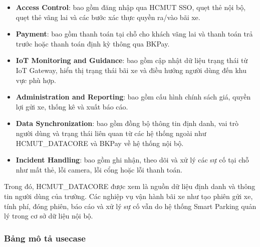     \begin{itemize}
        \item \textbf{Access Control}: bao gồm đăng nhập qua HCMUT SSO, quẹt thẻ nội bộ, quẹt thẻ vãng lai và các bước xác thực quyền ra/vào bãi xe.
        \item \textbf{Payment}: bao gồm thanh toán tại chỗ cho khách vãng lai và thanh toán trả trước hoặc thanh toán định kỳ thông qua BKPay.
        \item \textbf{IoT Monitoring and Guidance}: bao gồm cập nhật dữ liệu trạng thái từ IoT Gateway, hiển thị trạng thái bãi xe và điều hướng người dùng đến khu vực phù hợp.
        \item \textbf{Administration and Reporting}: bao gồm cấu hình chính sách giá, quyền lợi gửi xe, thống kê và xuất báo cáo.
        \item \textbf{Data Synchronization}: bao gồm đồng bộ thông tin định danh, vai trò người dùng và trạng thái liên quan từ các hệ thống ngoài như HCMUT\_DATACORE và BKPay về hệ thống nội bộ.
        \item \textbf{Incident Handling}: bao gồm ghi nhận, theo dõi và xử lý các sự cố tại chỗ như mất thẻ, lỗi camera, lỗi cổng hoặc lỗi thanh toán.
    \end{itemize}

    Trong đó, HCMUT\_DATACORE được xem là nguồn dữ liệu định danh và thông tin người dùng của trường. Các nghiệp vụ vận hành bãi xe như tạo phiên gửi xe, tính phí, đóng phiên, báo cáo và xử lý sự cố vẫn do hệ thống Smart Parking quản lý trong cơ sở dữ liệu nội bộ.


    \bigskip


\newpage

\subsubsection{Bảng mô tả usecase}

